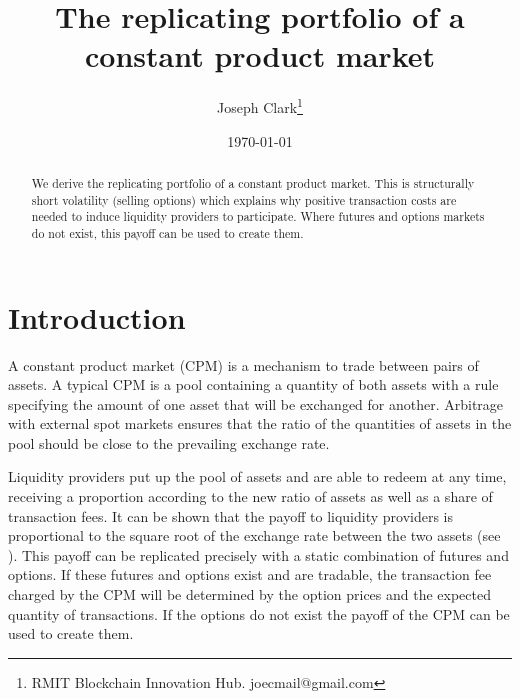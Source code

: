 \documentclass[12pt]{article}
\begin{document}
\begin{titlepage}
\title{The replicating portfolio of a constant product market}
\author{Joseph Clark\thanks{RMIT Blockchain Innovation Hub. joecmail@gmail.com} }
\date{\today}
\maketitle
\begin{abstract}
\noindent We derive the replicating portfolio of a constant product market. This is structurally short volatility (selling options) which explains why positive transaction costs are needed to induce liquidity providers to participate. Where futures and options markets do not exist, this payoff can be used to create them.


\bigskip
\end{abstract}
\setcounter{page}{0}
\thispagestyle{empty}
\end{titlepage}
\pagebreak \newpage




\doublespacing


\section{Introduction} \label{sec:introduction}

A constant product market (CPM) is a mechanism to trade between pairs of assets. A typical CPM is a pool containing a quantity of both assets with a rule specifying the amount of one asset that will be exchanged for another. Arbitrage with external spot markets ensures that the ratio of the quantities of assets in the pool should be close to the prevailing exchange rate. 

Liquidity providers put up the pool of assets and are able to redeem at any time, receiving a proportion according to the new ratio of assets as well as a share of transaction fees. It can be shown that the payoff to liquidity providers is proportional to the square root of the exchange rate between the two assets (see  \cite{ang20}). This payoff can be replicated precisely with a static combination of futures and options. If these futures and options exist and are tradable, the transaction fee charged by the CPM will be determined by the option prices and the expected quantity of transactions. If the options do not exist the payoff of the CPM can be used to create them.
\end{document}

